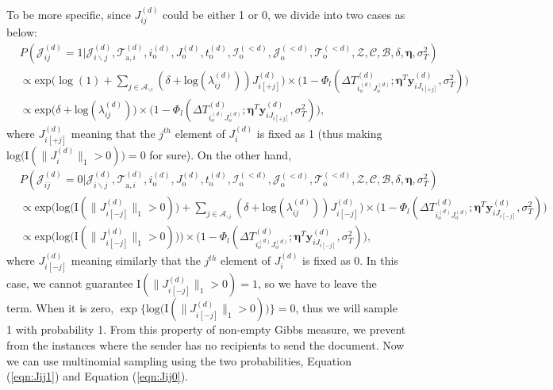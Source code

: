    To be more specific, since ${J}^{(d)}_{ij}$ could be either 1 or 0, we divide into two cases as below:
   \begin{equation}
   \begin{aligned}
   &P(\mathcal{J}^{(d)}_{ij}=1| \mathcal{J}^{(d)}_{i\backslash j}, \mathcal{T}^{(d)}_{\mbox{a}, i}, i^{(d)}_{\mbox{o}}, J^{(d)}_{\mbox{o}}, t^{(d)}_{\mbox{o}}, \mathcal{I}^{(<d)}_{\mbox{o}}, \mathcal{J}^{(<d)}_{\mbox{o}}, \mathcal{T}^{(<d)}_{\mbox{o}}, \mathcal{Z}, \mathcal{C}, \mathcal{B}, \delta, \boldsymbol{\eta}, \sigma_T^2)\\& \propto \mbox{exp}\Big(\log(1) +\sum_{j \in \mathcal{A}_{\backslash i}} ( \delta+\mbox{log}(\lambda_{ij}^{(d)}))J_{i[+j]}^{(d)}\Big) \times\Big(1 - \Phi_l(\Delta T^{(d)}_{i_o^{(d)}J_o^{(d)}};\boldsymbol{\eta}^T\boldsymbol{y}^{(d)}_{iJ_{i[+j]}}, \sigma_T^2)\Big)
   \\& \propto \mbox{exp}\Big(\delta+\mbox{log}(\lambda_{ij}^{(d)})\Big)\times\Big( 1 - \Phi_l(\Delta T^{(d)}_{i_o^{(d)}J_o^{(d)}};\boldsymbol{\eta}^T\boldsymbol{y}^{(d)}_{iJ_{i[+j]}}, \sigma_T^2)\Big),
   \end{aligned}\label{eqn:Jij1}
   \end{equation}
   where $J^{(d)}_{i[+j]}$ meaning that the $j^{th}$ element of $J_{i}^{(d)}$ is fixed as 1 (thus making $\mbox{log}\big(\text{I}(\lVert J_{i}^{(d)} \rVert_1 > 0 )\big) = 0$ for sure). On the other hand, 
   \begin{equation}
   \begin{aligned}
   &P(\mathcal{J}^{(d)}_{ij}=0| \mathcal{J}^{(d)}_{i\backslash j}, \mathcal{T}^{(d)}_{\mbox{a}, i}, i^{(d)}_{\mbox{o}}, J^{(d)}_{\mbox{o}}, t^{(d)}_{\mbox{o}}, \mathcal{I}^{(<d)}_{\mbox{o}}, \mathcal{J}^{(<d)}_{\mbox{o}}, \mathcal{T}^{(<d)}_{\mbox{o}}, \mathcal{Z}, \mathcal{C}, \mathcal{B}, \delta, \boldsymbol{\eta}, \sigma_T^2)\\& \propto \mbox{exp}\Big(\mbox{log}\big(\text{I}( \lVert J_{i[-j]}^{(d)} \rVert_1> 0 )\big) + \sum_{j \in \mathcal{A}_{\backslash i}} (\delta+\mbox{log}(\lambda_{ij}^{(d)}))J_{i[-j]}^{(d)} \Big)\times \Big( 1 - \Phi_l(\Delta T^{(d)}_{i_o^{(d)}J_o^{(d)}};\boldsymbol{\eta}^T\boldsymbol{y}^{(d)}_{iJ_{i[-j]}}, \sigma_T^2)\Big)
   \\& \propto \mbox{exp}\Big(\mbox{log}\big(\text{I}( \lVert J_{i[-j]}^{(d)} \rVert_1 > 0 )\big) \Big)\times \Big(1 - \Phi_l(\Delta T^{(d)}_{i_o^{(d)}J_o^{(d)}};\boldsymbol{\eta}^T\boldsymbol{y}^{(d)}_{iJ_{i[-j]}}, \sigma_T^2)\Big),
   \end{aligned}\label{eqn:Jij0}
   \end{equation}
   where $J^{(d)}_{i[-j]}$ meaning similarly that the $j^{th}$ element of $J_{i}^{(d)}$ is fixed as 0. In this case, we cannot guarantee $\text{I}( \lVert J_{i[-j]}^{(d)} \rVert_1 > 0)=1$, so we have to leave the term. When it is zero, $\exp\{\mbox{log}\big(\text{I}( \lVert J_{i[-j]}^{(d)} \rVert_1 > 0 )\big)\} = 0$, thus we will sample 1 with probability 1. From this property of non-empty Gibbs measure, we prevent from the instances where the sender has no recipients to send the document. Now we can use multinomial sampling using the two probabilities, Equation (\ref{eqn:Jij1}) and Equation (\ref{eqn:Jij0}).
